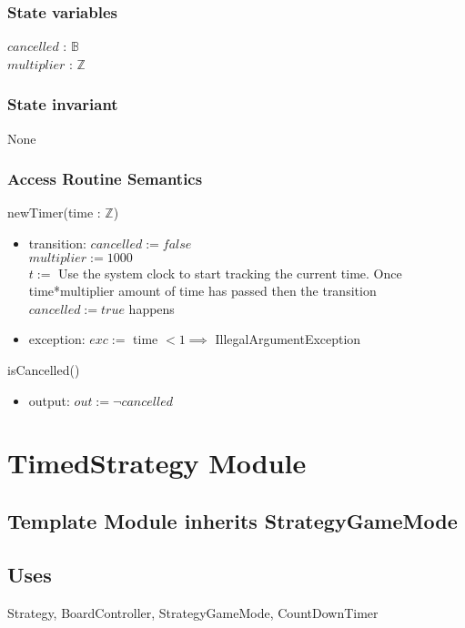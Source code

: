 \documentclass[12pt]{article}
\begin{document}
\subsubsection* {State variables}
\noindent $cancelled$ : $\mathbb{B}$\\
\noindent $multiplier$ : $\mathbb{Z}$\\


\subsubsection*{State invariant}
\noindent None

\subsubsection* {Access Routine Semantics}

\noindent newTimer(time : $\mathbb{Z}$)
\begin{itemize}
\item transition: $cancelled := false$\\
$multiplier := 1000$\\
$t := $ Use the system clock to start tracking the current time. Once time*multiplier amount of time has passed then the transition $cancelled := true$ happens\\
\item exception: $exc := $ time $< 1 \implies$ IllegalArgumentException
\end{itemize}

\noindent isCancelled()
\begin{itemize}
\item output: $out := \lnot cancelled$
\end{itemize}

\newpage

\section* {TimedStrategy Module}

\subsection* {Template Module inherits StrategyGameMode}


\subsection*{Uses}
Strategy, BoardController, StrategyGameMode, CountDownTimer
\end{document}
